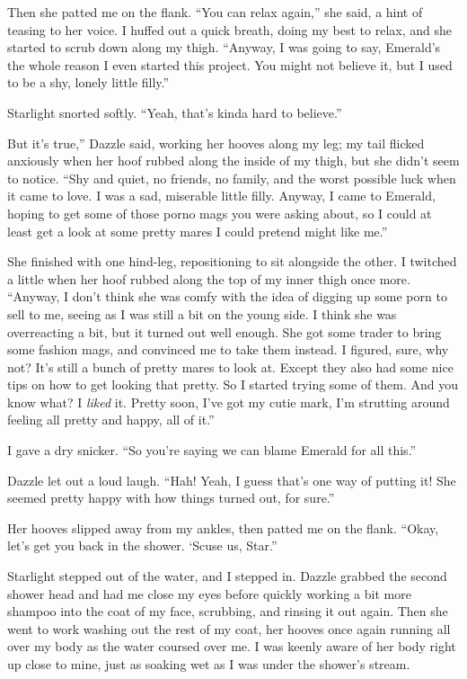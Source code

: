 Then she patted me on the flank. “You can relax again,” she said, a hint of teasing to her voice. I huffed out a quick breath, doing my best to relax, and she started to scrub down along my thigh. “Anyway, I was going to say, Emerald’s the whole reason I even started this project. You might not believe it, but I used to be a shy, lonely little filly.”

Starlight snorted softly. “Yeah, that’s kinda hard to believe.”

\leavevmode{}But it’s true,” Dazzle said, working her hooves along my leg; my tail flicked anxiously when her hoof rubbed along the inside of my thigh, but she didn’t seem to notice. “Shy and quiet, no friends, no family, and the worst possible luck when it came to love. I was a sad, miserable little filly. Anyway, I came to Emerald, hoping to get some of those porno mags you were asking about, so I could at least get a look at some pretty mares I could pretend might like me.”

She finished with one hind-leg, repositioning to sit alongside the other. I twitched a little when her hoof rubbed along the top of my inner thigh once more. “Anyway, I don’t think she was comfy with the idea of digging up some porn to sell to me, seeing as I was still a bit on the young side. I think she was overreacting a bit, but it turned out well enough. She got some trader to bring some fashion mags, and convinced me to take them instead. I figured, sure, why not? It’s still a bunch of pretty mares to look at. Except they also had some nice tips on how to get looking that pretty. So I started trying some of them. And you know what? I \textit{liked} it. Pretty soon, I’ve got my cutie mark, I’m strutting around feeling all pretty and happy, all of it.”

I gave a dry snicker. “So you’re saying we can blame Emerald for all this.”

Dazzle let out a loud laugh. “Hah! Yeah, I guess that’s one way of putting it! She seemed pretty happy with how things turned out, for sure.”

Her hooves slipped away from my ankles, then patted me on the flank. “Okay, let’s get you back in the shower. ‘Scuse us, Star.”

Starlight stepped out of the water, and I stepped in. Dazzle grabbed the second shower head and had me close my eyes before quickly working a bit more shampoo into the coat of my face, scrubbing, and rinsing it out again. Then she went to work washing out the rest of my coat, her hooves once again running all over my body as the water coursed over me. I was keenly aware of her body right up close to mine, just as soaking wet as I was under the shower’s stream.

